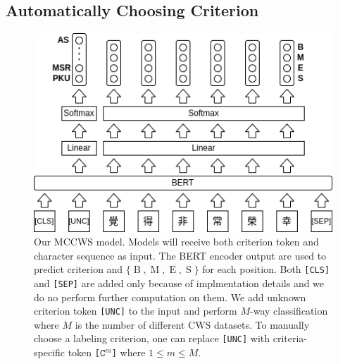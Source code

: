 \documentclass[11pt]{article}
\newcommand{\set}[1]{\lbrace #1 \rbrace}
\newcommand{\CLS}{\texttt{[CLS]}}
\newcommand{\SEP}{\texttt{[SEP]}}
\newcommand{\UNC}{\texttt{[UNC]}}
\newcommand{\Ck}[1]{\texttt{[\(\mathtt{C}^{#1}\)]}}
\newcommand{\BTag}{\operatorname{B}}
\newcommand{\MTag}{\operatorname{M}}
\newcommand{\ETag}{\operatorname{E}}
\newcommand{\STag}{\operatorname{S}}
\newcommand{\TagSet}{\set{\BTag, \MTag, \ETag, \STag}}
\begin{document}
\subsection{Automatically Choosing Criterion}\label{sec:auto}

\begin{figure}[t!]
  \center
  \includegraphics[width=.9\columnwidth]{./pic2.png}
  \caption{Our MCCWS model.
    Models will receive both criterion token and character sequence as input.
    The BERT encoder output are used to predict criterion and \(\TagSet\) for each position.
    Both \CLS{} and \SEP{} are added only because of implmentation details and we do no perform further computation on them.
    We add unknown criterion token \UNC{} to the input and perform \(M\)-way classification where \(M\) is the number of different CWS datasets.
    To manually choose a labeling criterion, one can replace \UNC{} with criteria-specific token \Ck{m} where \(1 \leq m \leq M\).}
  \label{fig:1}
\end{figure}
\end{document}
